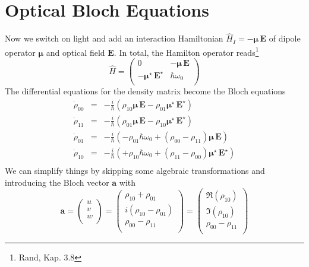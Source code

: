 \section{Optical Bloch Equations}

Now we switch on light and add an interaction Hamiltonian $\hat{H}_I = -\boldsymbol{\mu} \, \boldsymbol{E}$ of dipole operator $\boldsymbol{\mu} $ and optical field   $\boldsymbol{E}$. In total, the Hamilton operator reads\footnote{Rand, Kap. 3.8}
\[
 \hat{H } = \begin{pmatrix}
  0 & - {\boldsymbol{\mu}} \, \boldsymbol{E} \\ - {\boldsymbol{\mu}}^\star \, \boldsymbol{E}^\star & \hbar \omega_0 \\
 \end{pmatrix}
\]
The differential equations for the density matrix become the Bloch equations
\begin{eqnarray*}
\dot{\rho}_{00} &=&  - \frac{i}{\hbar} \left( \rho_{10} \boldsymbol{\mu} \, \boldsymbol{E} - \rho_{01} \boldsymbol{\mu}^\star \, \boldsymbol{E}^\star \right) \\
%
\dot{\rho}_{11} &=&  - \frac{i}{\hbar} \left( \rho_{01} \boldsymbol{\mu} \, \boldsymbol{E} - \rho_{10} \boldsymbol{\mu}^\star \, \boldsymbol{E}^\star \right) \\
%
\dot{\rho}_{01} &=& - \frac{i}{\hbar}  \left( - \rho_{01} \hbar \omega_0 + (\rho_{00} - \rho_{11})  \boldsymbol{\mu} \, \boldsymbol{E} \right) \\
%
\dot{\rho}_{10} &=& - \frac{i}{\hbar}  \left( + \rho_{10} \hbar \omega_0 + (\rho_{11} - \rho_{00})  \boldsymbol{\mu}^\star \, \boldsymbol{E}^\star \right) \\
\end{eqnarray*}
We can simplify things by skipping some algebraic transformations and introducing the Bloch vector $\boldsymbol{a}$ with
\[
\boldsymbol{a} = 
\begin{pmatrix}
u \\ v \\ w \\
\end{pmatrix}
= 
\begin{pmatrix}
\rho_{10} + \rho_{01} \\ i (\rho_{10} - \rho_{01}) \\ \rho_{00} - \rho_{11} \\
\end{pmatrix}
= 
\begin{pmatrix}
\Re (\rho_{10})  \\ \Im (\rho_{10}) \\ \rho_{00} - \rho_{11} \\
\end{pmatrix}
\]
